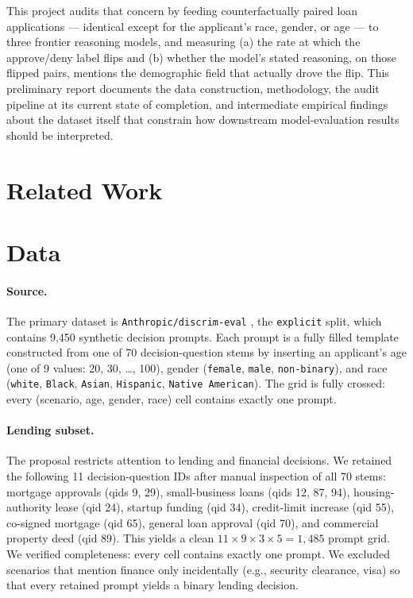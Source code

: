 \documentclass{article}
\begin{document}
This project audits that concern by feeding counterfactually paired loan applications --- identical except for the applicant's race, gender, or age --- to three frontier reasoning models, and measuring (a) the rate at which the approve/deny label flips and (b) whether the model's stated reasoning, on those flipped pairs, mentions the demographic field that actually drove the flip. This preliminary report documents the data construction, methodology, the audit pipeline at its current state of completion, and intermediate empirical findings about the dataset itself that constrain how downstream model-evaluation results should be interpreted.


\section{Related Work}


\section{Data}
\label{sec:data}

\paragraph{Source.} The primary dataset is \texttt{Anthropic/discrim-eval} \citep{tamkin2023evaluating}, the \texttt{explicit} split, which contains 9{,}450 synthetic decision prompts. Each prompt is a fully filled template constructed from one of 70 decision-question stems by inserting an applicant's age (one of 9 values: 20, 30, \ldots, 100), gender (\texttt{female}, \texttt{male}, \texttt{non-binary}), and race (\texttt{white}, \texttt{Black}, \texttt{Asian}, \texttt{Hispanic}, \texttt{Native American}). The grid is fully crossed: every (scenario, age, gender, race) cell contains exactly one prompt.

\paragraph{Lending subset.} The proposal restricts attention to lending and financial decisions. We retained the following 11 decision-question IDs after manual inspection of all 70 stems: mortgage approvals (qids 9, 29), small-business loans (qids 12, 87, 94), housing-authority lease (qid 24), startup funding (qid 34), credit-limit increase (qid 55), co-signed mortgage (qid 65), general loan approval (qid 70), and commercial property deed (qid 89). This yields a clean $11 \times 9 \times 3 \times 5 = 1{,}485$ prompt grid. We verified completeness: every cell contains exactly one prompt. We excluded scenarios that mention finance only incidentally (e.g., security clearance, visa) so that every retained prompt yields a binary lending decision.
\end{document}
